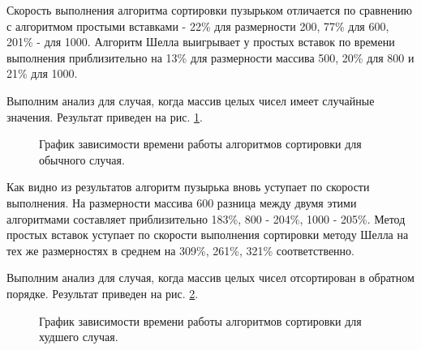 Скорость выполнения алгоритма сортировки пузырьком отличается по сравнению с алгоритмом простыми вставками - 22\% для размерности 200, 77\% для 600, 201\% - для 1000. Алгоритм Шелла выигрывает у простых вставок по времени выполнения приблизительно на 13\% для размерности массива 500, 20\% для 800 и 21\% для 1000.

Выполним анализ для случая, когда массив целых чисел имеет случайные значения. Результат приведен на рис. \ref{fg:ref2}.
\begin{figure}[H]
	\centering
	\caption{График зависимости времени работы алгоритмов сортировки для обычного случая.} 
	\label{fg:ref2}
\end{figure}
Как видно из результатов алгоритм пузырька вновь уступает по скорости выполнения. На размерности массива 600 разница между двумя этими алгоритмами составляет приблизительно 183\%, 800 - 204\%, 1000 - 205\%. Метод простых вставок уступает по скорости выполнения сортировки методу Шелла на тех же размерностях в среднем на 309\%, 261\%, 321\% соответственно. 

Выполним анализ для случая, когда массив целых чисел отсортирован в обратном порядке. Результат приведен на рис. \ref{fg:ref3}.
\begin{figure}[H]
	\centering
	\caption{График зависимости времени работы алгоритмов сортировки для худшего случая.} 
	\label{fg:ref3}
\end{figure}

